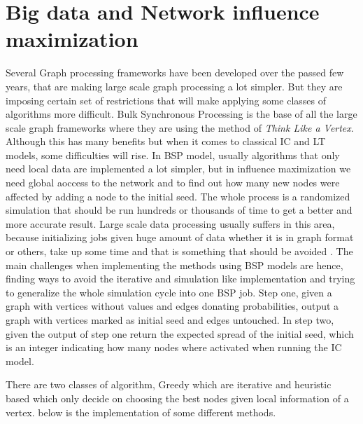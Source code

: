 \documentclass[english]{tktltiki}
\begin{document}
\section{Big data and Network influence maximization}
Several Graph processing frameworks have been developed over the passed few years, that are making large scale graph processing a lot simpler. But they are imposing certain set of restrictions that will make applying some classes of algorithms more difficult. Bulk Synchronous Processing is the base of all the large scale graph frameworks where they are using the method of \textit{Think Like a Vertex}. Although this has many benefits but when it comes to classical IC and LT models, some difficulties will rise. In BSP model, usually algorithms that only need local data are implemented a lot simpler, but in influence maximization we need global aoccess to the network and to find out how many new nodes were affected by adding a node to the initial seed. The whole process is a randomized simulation that should be run hundreds or thousands of time to get a better and more accurate result. Large scale data processing usually suffers in this area, because initializing jobs given huge amount of data whether it is in graph format or others, take up some time and that is something that should be avoided . 
The main challenges when implementing the methods using BSP models are hence, finding ways to avoid the iterative and simulation like implementation and trying to generalize the whole simulation cycle into one BSP job.
 Step one, given a graph with vertices without values and edges donating probabilities, output a graph with vertices marked as initial seed and edges untouched. 
In step two, given the output of step one return the expected spread of the initial seed, which is an integer indicating how many nodes where activated when running the IC model.

There are two classes of algorithm, Greedy which are iterative and heuristic based which only decide on choosing the best nodes given local information of a vertex. below is the implementation of some different methods.
\end{document}
